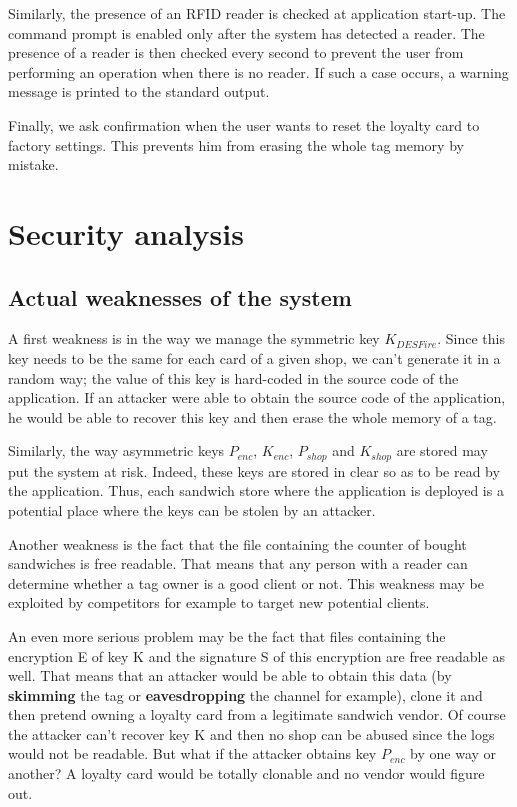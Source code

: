 \documentclass[a4paper,11pt,oneside]{article}
\begin{document}
Similarly, the presence of an RFID reader is checked at application start-up. The command prompt is enabled only after the system has detected a reader. The presence of a reader is then checked every second to prevent the user from performing an operation when there is no reader. If such a case occurs, a warning message is printed to the standard output. 

Finally, we ask confirmation when the user wants to reset the loyalty card to factory settings. This prevents him from erasing the whole tag memory by mistake.  


\newpage
\section{Security analysis}

\subsection{Actual weaknesses of the system}

A first weakness is in the way we manage the symmetric key $K_{DESFire}$. Since this key needs to be the same for each card of a given shop, we can't generate it in a random way; the value of this key is hard-coded in the source code of the application. If an attacker were able to obtain the source code of the application, he would be able to recover this key and then erase the whole memory of a tag. 

Similarly, the way asymmetric keys $P_{enc}$, $K_{enc}$, $P_{shop}$ and $K_{shop}$ are stored may put the system at risk. Indeed, these keys are stored in clear so as to be read by the application. Thus, each sandwich store where the application is deployed is a potential place where the keys can be stolen by an attacker.

Another weakness is the fact that the file containing the counter of bought sandwiches is free readable. That means that any person with a reader can determine whether a tag owner is a good client or not. This weakness may be exploited by competitors for example to target new potential clients.  

An even more serious problem may be the fact that files containing the encryption E of key K and the signature S of this encryption are free readable as well. That means that an attacker would be able to obtain this data (by \textbf{skimming} the tag or \textbf{eavesdropping} the channel for example), clone it and then pretend owning a loyalty card from a legitimate sandwich vendor. Of course the attacker can't recover key K and then no shop can be abused since the logs would not be readable. But what if the attacker obtains key $P_{enc}$ by one way or another? A loyalty card would be totally clonable and no vendor would figure out. 
\end{document}
